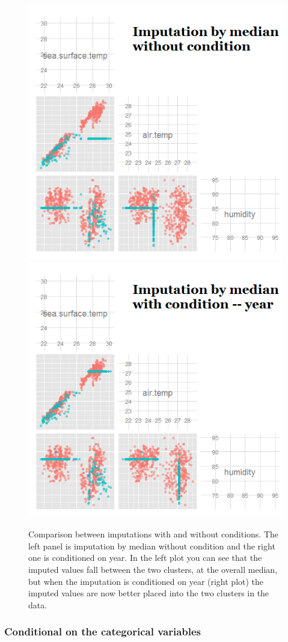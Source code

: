 \documentclass[english]{article}
\begin{document}
\begin{center}
%
\begin{figure}[h]
\begin{centering}
\includegraphics[width=.48\textwidth]{fig4-1}
\includegraphics[width=.48\textwidth]{fig4-2}
\par\end{centering}

\caption{\label{fig: condition}{Comparison between imputations
with and without conditions. The left panel is imputation by median
without condition and the right one is conditioned on year. In the left plot you can see that the imputed values fall between the two clusters, at the overall median, but when the imputation is conditioned on year (right plot) the imputed values are now better placed into the two clusters in the data.}}

\end{figure}

\par\end{center}

\subsubsection{Conditional on the categorical variables}
\end{document}
